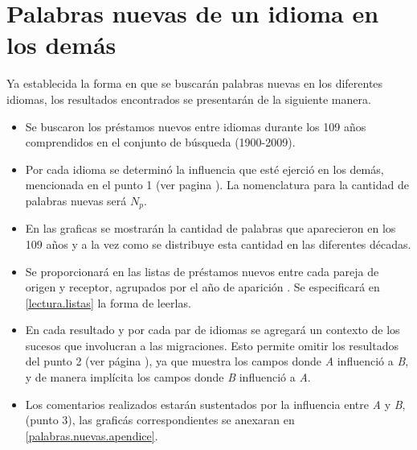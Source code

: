 \section{Palabras nuevas de un idioma en los demás} %
 

Ya establecida la forma en que se buscarán  palabras nuevas en los diferentes idiomas,  los resultados encontrados se presentarán de la siguiente manera.

\begin{itemize}

\item Se buscaron los préstamos nuevos entre idiomas durante los 109 años comprendidos en el conjunto de búsqueda (1900-2009).
	
\item Por cada idioma se determinó la influencia que esté ejerció en los demás, mencionada en el punto 1 (ver pagina \pageref{proceso.nuevos}). La nomenclatura para la cantidad de palabras nuevas será $N_{p}$.



\item En las graficas se mostrarán la cantidad de palabras que aparecieron en los 109 años y a la vez como se distribuye esta cantidad en las diferentes décadas. 

\item Se proporcionará en \cite{prestamos_nuevos} las listas  de préstamos nuevos entre cada pareja de origen y receptor, agrupados por el año de aparición .  Se especificará en \ref{lectura.listas}  la forma de leerlas.

\item En cada resultado y por cada par de idiomas se agregará un contexto  de los sucesos  que involucran a las migraciones. Esto permite omitir los resultados del punto 2 (ver  página \pageref{proceso.nuevos}), ya que muestra los campos donde \textit{A} influenció a  \textit{B}, y  de manera implícita los campos donde \textit{B} influenció a \textit{A}.

\item Los comentarios realizados estarán sustentados por la influencia entre \textit{A} y \textit{B}, (punto 3), las graficás correspondientes se anexaran en \ref{palabras.nuevas.apendice}. 

\end{itemize}

